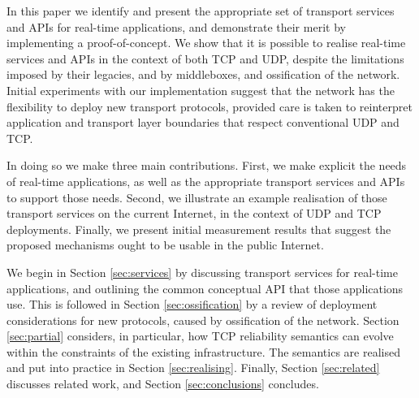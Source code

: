 \documentclass[10pt]{sig-alternate-05-2015}
\begin{document}

In this paper we identify and present the appropriate set of transport
services and APIs for real-time applications, and demonstrate their
merit by implementing a proof-of-concept. We show that it is possible
to realise real-time services and APIs in the context of both TCP and
UDP, despite the limitations imposed by their legacies, and by
middleboxes, and ossification of the network.  Initial experiments
with our implementation suggest that
the network has the flexibility to deploy new transport protocols, provided care
is taken to reinterpret application and transport layer boundaries that respect
conventional UDP and TCP.


In doing so we make three main contributions. First, we make explicit
the needs of real-time applications, as well as the appropriate
transport services and APIs to support those needs. Second, we
illustrate an example realisation of those transport services on the
current Internet, in the context of UDP and TCP deployments. Finally,
we present initial measurement results that suggest the proposed
mechanisms ought to be usable in the public Internet.


We begin in Section \ref{sec:services} by discussing transport
services for real-time applications, and outlining the common
conceptual API that those applications use. This is followed in
Section \ref{sec:ossification} by a review of deployment
considerations for new protocols, caused by ossification of the
network. Section \ref{sec:partial} considers, in particular, how TCP
reliability semantics can evolve within the constraints of the
existing infrastructure. The semantics are realised and put into
practice in Section \ref{sec:realising}.
Finally, Section \ref{sec:related} discusses related work, and Section
\ref{sec:conclusions} concludes.
\end{document}
